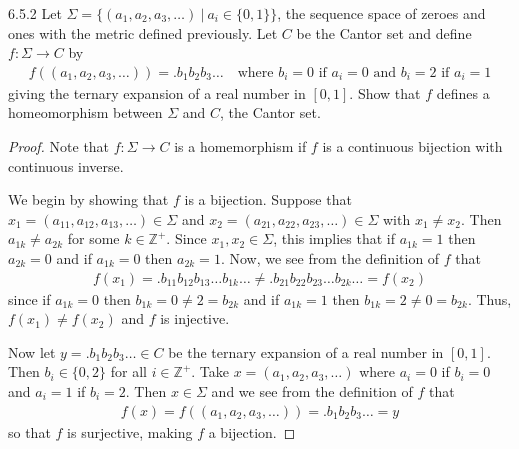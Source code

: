 \begin{problem}{6.5.2}
  Let $\Sigma = \{(a_1, a_2, a_3, \dots) \ |\ a_i \in \{0, 1\}\}$, the sequence
  space of zeroes and ones with the metric defined previously. Let $C$ be the
  Cantor set and define $f: \Sigma \to C$ by
  \begin{align*}
    f((a_1, a_2, a_3, \dots)) = .b_1b_2b_3\ldots \quad \text{where $b_i = 0$ if $a_i = 0$ and $b_i = 2$ if $a_i = 1$}
  \end{align*}
  giving the ternary expansion of a real number in $[0, 1]$. Show that $f$ defines
  a homeomorphism between $\Sigma$ and $C$, the Cantor set.
\end{problem}


\begin{proof}
  Note that $f: \Sigma \to C$ is a homemorphism if $f$ is a continuous bijection
  with continuous inverse.

  We begin by showing that $f$ is a bijection.
  Suppose that $x_1 = (a_{11}, a_{12}, a_{13}, \dots) \in \Sigma$ and $x_2 = (a_{21}, a_{22}, a_{23}, \dots) \in \Sigma$
  with $x_1 \neq x_2$. Then $a_{1k} \neq a_{2k}$ for some $k \in \mathbb{Z}^+$. Since $x_1, x_2 \in \Sigma$,
  this implies that if $a_{1k} = 1$ then $a_{2k} = 0$ and if $a_{1k} = 0$ then $a_{2k} = 1$.
  Now, we see from the definition of $f$ that
  \begin{align*}
    f(x_1) =  .b_{11}b_{12}b_{13}\ldots b_{1k}\ldots \neq .b_{21}b_{22}b_{23}\ldots b_{2k}\ldots = f(x_2)
  \end{align*}
  since if $a_{1k} = 0$ then
  $b_{1k} = 0 \neq 2 = b_{2k}$ and if $a_{1k} = 1$ then
  $b_{1k} = 2 \neq 0 = b_{2k}$. Thus, $f(x_1) \neq f(x_2)$ and $f$ is injective.

  Now let $y = .b_1b_2b_3\ldots \in C$ be the ternary expansion of a real number in $[0, 1]$.
  Then $b_i \in \{0,2\}$ for all $i \in \mathbb{Z}^+$.
  Take $x = (a_1, a_2, a_3, \dots)$ where $a_i = 0$ if $b_i = 0$ and $a_i = 1$ if $b_i = 2$.
  Then $x\in \Sigma$ and we see from the definition of $f$ that
  \begin{align*}
    f(x) = f((a_1, a_2, a_3, \dots)) = .b_1b_2b_3\ldots = y
  \end{align*}
  so that $f$ is surjective, making $f$ a bijection.


\end{proof}

